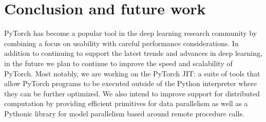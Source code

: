 \section{Conclusion and future work}
PyTorch has become a popular tool in the deep learning research community by combining a focus on usability with careful performance considerations. In addition to continuing to support the latest trends and advances in deep learning, in the future we plan to continue to improve the speed and scalability of PyTorch. Most notably, we are working on the PyTorch JIT: a suite of tools that allow PyTorch programs to be executed outside of the Python interpreter where they can be further optimized. We also intend to improve support for distributed computation by providing efficient primitives for data parallelism as well as a Pythonic library for model parallelism based around remote procedure calls.